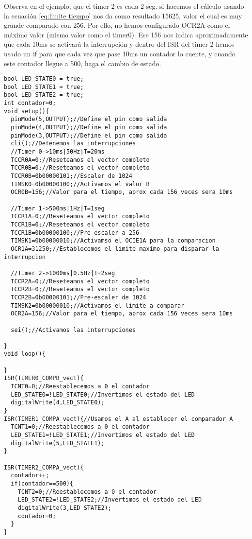 \documentclass[
	12pt, %
	fleqn, %
	a4paper, %
	oneside, %
]{LegrandOrangeBook}
\begin{document}
Observa en el ejemplo, que el timer 2 es cada 2 seg. si hacemos el cálculo usando la ecuación \ref{eq:limite tiempo} nos da como resultado 15625, valor el cual es muy grande comparado con 256. Por ello, no hemos configurado OCR2A como el máximo valor (mismo valor como el timer0). Ese 156 nos indica aproximadamente que cada 10ms se activará la interrupción y dentro del ISR del timer 2 hemos usado un if para que cada vez que pase 10ms un contador lo cuente, y cuando este contador llegue a 500, haga el cambio de estado.
\begin{lstlisting}[language=Arduino,caption={Uso de timer0 (cada 10ms) y timer1 (500ms)}]
bool LED_STATE0 = true;
bool LED_STATE1 = true;
bool LED_STATE2 = true;
int contador=0;
void setup(){
  pinMode(5,OUTPUT);//Define el pin como salida
  pinMode(4,OUTPUT);//Define el pin como salida
  pinMode(3,OUTPUT);//Define el pin como salida
  cli();//Detenemos las interrupciones
  //Timer 0->10ms|50Hz|T=20ms
  TCCR0A=0;//Reseteamos el vector completo
  TCCR0B=0;//Reseteamos el vector completo
  TCCR0B=0b00000101;//Escaler de 1024
  TIMSK0=0b00000100;//Activamos el valor B
  OCR0B=156;//Valor para el tiempo, aprox cada 156 veces sera 10ms
  
  //Timer 1->500ms|1Hz|T=1seg
  TCCR1A=0;//Reseteamos el vector completo
  TCCR1B=0;//Reseteamos el vector completo
  TCCR1B=0b00000100;//Pre-escaler a 256
  TIMSK1=0b00000010;//Activamso el OCIE1A para la comparacion
  OCR1A=31250;//Establecemos el limite maximo para disparar la interrupcion
  
  //Timer 2->1000ms|0.5Hz|T=2seg
  TCCR2A=0;//Reseteamos el vector completo
  TCCR2B=0;//Reseteamos el vector completo
  TCCR2B=0b00000101;//Pre-escaler de 1024
  TIMSK2=0b00000010;//Activamos el limite a comparar
  OCR2A=156;//Valor para el tiempo, aprox cada 156 veces sera 10ms

  sei();//Activamos las interrupciones
  
}
void loop(){

}
ISR(TIMER0_COMPB_vect){
  TCNT0=0;//Reestablecemos a 0 el contador
  LED_STATE0=!LED_STATE0;//Invertimos el estado del LED
  digitalWrite(4,LED_STATE0);
}
ISR(TIMER1_COMPA_vect){//Usamos el A al establecer el comparador A
  TCNT1=0;//Reestablecemos a 0 el contador
  LED_STATE1=!LED_STATE1;//Invertimos el estado del LED
  digitalWrite(5,LED_STATE1);
}

ISR(TIMER2_COMPA_vect){
  contador++;
  if(contador==500){
    TCNT2=0;//Reestablecemos a 0 el contador
  	LED_STATE2=!LED_STATE2;//Invertimos el estado del LED
  	digitalWrite(3,LED_STATE2);
    contador=0;
  }
}
\end{lstlisting}
\end{document}
